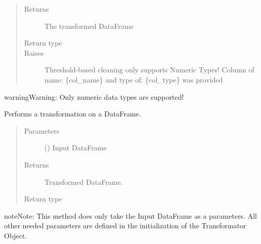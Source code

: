 \documentclass[a4paper,10pt, twoside,english]{sphinxmanual}
\begin{document}
\begin{fulllineitems}
\begin{quote}
\begin{description}
\item[{Returns}] \leavevmode
The transformed DataFrame

\item[{Return type}] \leavevmode
{}

\item[{Raises}] \leavevmode
{} \textendash{} Threshold-based cleaning only supports Numeric Types!
Column of name: \{col\_name\} and type of: \{col\_type\} was provided

\end{description}\end{quote}

\begin{sphinxadmonition}{warning}{Warning:}
Only numeric data types are supported!
\end{sphinxadmonition}

\begin{fulllineitems}
\label{\detokenize{transformer/threshold_cleaner:spooq2.transformer.threshold_cleaner.ThresholdCleaner.transform}}
Performs a transformation on a DataFrame.
\begin{quote}\begin{description}
\item[{Parameters}] \leavevmode
{} () \textendash{} Input DataFrame

\item[{Returns}] \leavevmode
Transformed DataFrame.

\item[{Return type}] \leavevmode
{}

\end{description}\end{quote}

\begin{sphinxadmonition}{note}{Note:}
This method does only take the Input DataFrame as a parameters. All other needed parameters
are defined in the initialization of the Transformator Object.
\end{sphinxadmonition}

\end{fulllineitems}


\end{fulllineitems}
\end{document}
